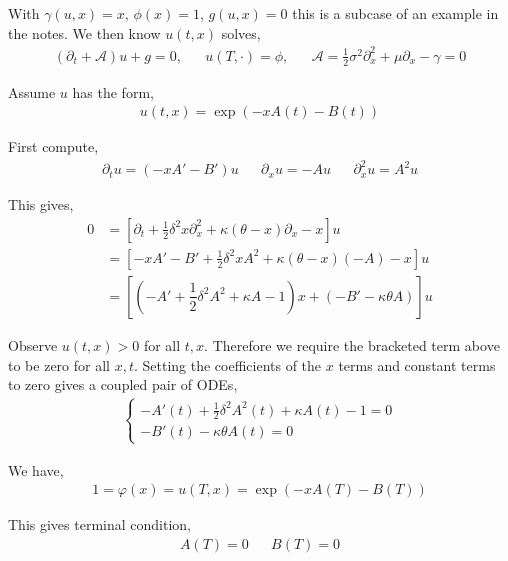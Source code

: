 \documentclass[10pt]{article}
\begin{document}
\begin{solution}[Solution]
With \( \gamma(u,x) = x \), \( \phi(x) = 1 \), \( g(u,x) = 0 \) this is a subcase of an example in the notes. We then know \( u(t,x) \) solves,
\begin{align*}
    (\partial_t + \mathcal{A})u + g = 0, && u(T,\cdot) = \phi, && \mathcal{A} = \frac{1}{2} \sigma^2 \partial_x^2 + \mu \partial_x-\gamma = 0
\end{align*}

Assume \( u \) has the form,
\begin{align*}
    u(t,x) = \exp \left( -x A(t) - B(t) \right)
\end{align*}

First compute,
\begin{align*}
    \partial_t u = (-xA'-B')u &&
    \partial_x u = -A u &&
    \partial_x^2 u = A^2 u
\end{align*}

This gives,
\begin{align*}
    0 &= \left[\partial_t + \frac{1}{2} \delta^2 x \partial_x^2 + \kappa(\theta-x) \partial_x - x \right] u  \\
    &= \left[ - xA'-B' + \frac{1}{2} \delta^2 x A^2 + \kappa(\theta-x) (-A) - x \right] u \\
    &=  \left[\left(-A'+\dfrac{1}{2}\delta^2A^2 + \kappa A - 1\right) x + \left( -B' - \kappa\theta A \right) \right] u
\end{align*}

Observe \( u(t,x) > 0 \) for all \( t,x \). Therefore we require the bracketed term above to be zero for all \( x, t \). Setting the coefficients of the \( x \) terms and constant terms to zero gives a coupled pair of ODEs,
\begin{align*}
    \begin{cases}
        -A'(t)+\frac{1}{2}\delta^2A^2(t) + \kappa A(t) - 1 = 0 \\
        -B'(t) - \kappa\theta A(t)  = 0
    \end{cases}
\end{align*}

We have,
\begin{align*}
    1 = \varphi(x) = u(T,x) = \exp \left( -xA(T) - B(T) \right)
\end{align*}

This gives terminal condition,
\begin{align*}
    A(T) = 0 &&  B(T) = 0
\end{align*}



\end{solution}
\end{document}

